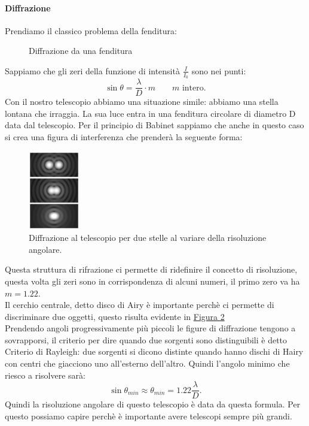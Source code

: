 \paragraph{Diffrazione}%
Prendiamo il classico problema della fenditura:
\begin{figure}[H]
    \centering
    \caption{Diffrazione da una fenditura}
    \label{fig:diffrazione-da-una-fenditura}
\end{figure}
\noindent
Sappiamo che gli zeri della funzione di intensità $\frac{I}{I_0}$ sono nei punti:
\[
	\sin\theta = \frac{\lambda}{D}\cdot m \quad \quad m \text{ intero}
.\] 
Con il nostro telescopio abbiamo una situazione simile: abbiamo una stella lontana che irraggia. La sua luce entra in una fenditura circolare di diametro D data dal telescopio. Per il principio di Babinet sappiamo che anche in questo caso si crea una figura di interferenza che prenderà la seguente forma:
\begin{figure}[H]
	\centering
	\includegraphics[width=0.2\textwidth]{figures/diffraction.png}
	\caption{\scriptsize Diffrazione al telescopio per due stelle al variare della risoluzione angolare.}
	\label{fig:diffraction}
\end{figure}
\noindent
Questa struttura di rifrazione ci permette di ridefinire il concetto di risoluzione, questa volta gli zeri sono in corrispondenza di alcuni numeri, il primo zero va ha $m=1.22$. \\
Il cerchio centrale, detto disco di Airy è importante perchè ci permette di discriminare due oggetti, questo risulta evidente in \hyperref[fig:diffraction]{Figura 2}\\
Prendendo angoli progressivamente più piccoli le figure di diffrazione tengono a sovrapporsi, il criterio per dire quando due sorgenti sono distinguibili è detto Criterio di Rayleigh: due sorgenti si dicono distinte quando hanno dischi di Hairy con centri che giacciono uno all'esterno dell'altro.
Quindi l'angolo minimo che riesco a risolvere sarà: 
\[
	\sin\theta_{min} \approx \theta_{min} =  1.22 \frac{\lambda}{D}
.\]
Quindi la risoluzione angolare di questo telescopio è data da questa formula. Per questo possiamo capire perchè è importante avere telescopi sempre più grandi.\\

